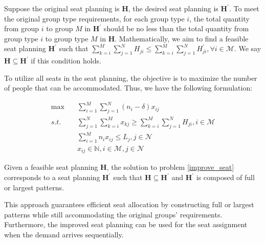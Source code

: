 Suppose the original seat planning is $\bm{H}$, the desired seat planning is $\bm{H}^{\prime}$. To meet the original group type requirements, for each group type $i$, the total quantity from group $i$ to group $M$ in $\bm{H}^{\prime}$ should be no less than the total quantity from group type $i$ to group type $M$ in $\bm{H}$. Mathematically, we aim to find a feasible seat planning $\bm{H}^{\prime}$ such that $\sum_{k=i}^{M} \sum_{j=1}^{N} H_{ji} \leq \sum_{k=i}^{M} \sum_{j=1}^{N} H^{'}_{ji}, \forall i \in \mathcal{M}$. We say $\bm{H} \subseteq \bm{H}^{'}$ if this condition holds.

To utilize all seats in the seat planning, the objective is to maximize the number of people that can be accommodated. Thus, we have the following formulation:

\begin{equation}\label{improve_seat}
  \begin{aligned}
  \max \quad & \sum_{i=1}^{M} \sum_{j=1}^{N} (n_i-\delta)  x_{ij} \\
  s.t. \quad & \sum_{j=1}^{N} \sum_{k=i}^{M} x_{kj} \geq  \sum_{k=i}^{M} \sum_{j=1}^{N} H_{ji}, i \in \mathcal{M} \\
  & \sum_{i=1}^{M} n_{i} x_{ij} \leq L_{j}, j \in \mathcal{N} \\
  & x_{ij} \in \mathbb{N}, i \in \mathcal{M}, j \in \mathcal{N}
  \end{aligned}
\end{equation}

\begin{prop}\label{prop_construction}
Given a feasible seat planning $\bm{H}$, the solution to problem \eqref{improve_seat} corresponds to a seat planning $\bm{H}^{\prime}$ such that $\bm{H} \subseteq \bm{H}^{\prime}$ and $\bm{H}^{'}$ is composed of full or largest patterns.
\end{prop}


This approach guarantees efficient seat allocation by constructing full or largest patterns while still accommodating the original groups' requirements. Furthermore, the improved seat planning can be used for the seat assignment when the demand arrives sequentially.





